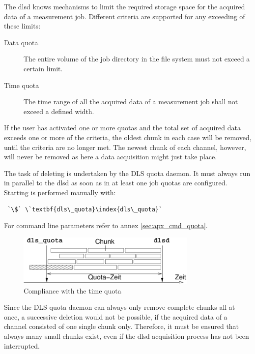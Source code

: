 \documentclass[a4paper,12pt,BCOR6mm,bibtotoc,idxtotoc]{scrbook}
\begin{document}
The dlsd knows mechanisms to limit the required storage space for the acquired data of a measurement job. Different criteria are supported for any exceeding of these limits:

\begin{description} 
\item[Data quota] The entire volume of the job directory in the file system must not exceed a certain limit. 
\item[Time quota] The time range of all the acquired data of a measurement job shall not exceed a defined width. \end{description}

If the user has activated one or more quotas and the total set of acquired data exceeds one or more of the criteria, the oldest chunk in each case will be removed, until the criteria are no longer met. The newest chunk of each channel, however, will never be removed as here a data acquisition might just take place.

The task of deleting is undertaken by the DLS quota daemon. It must always run in parallel to the dlsd as soon as in at least one job quotas are configured. Starting is performed manually with:

\begin{lstlisting} `\$` \`textbf{dls\_quota}\index{dls\_quota}` \end{lstlisting}

For command line parameters refer to annex \ref{sec:apx_cmd_quota}.

\begin{figure}[htb] \begin{center} \includegraphics[width=250pt]{bilder/quota} \end{center} \caption{Compliance with the time quota} \label{fig:quota} \end{figure}

Since the DLS quota daemon can always only remove complete chunks all at once, a successive deletion would not be possible, if the acquired data of a channel consisted of one single chunk only. Therefore, it must be ensured that always many small chunks exist, even if the dlsd acquisition process has not been interrupted.
\end{document}
